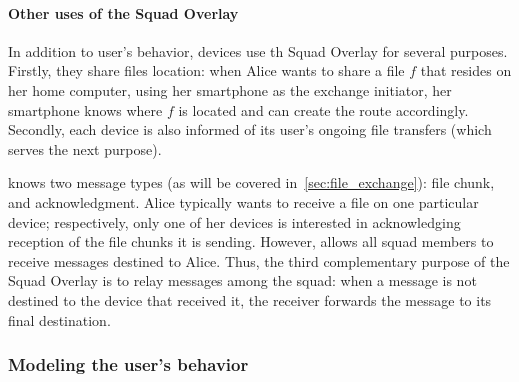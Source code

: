 


\paragraph*{Other uses of the Squad Overlay} In addition to user's behavior, devices use th Squad Overlay for several purposes. Firstly, they share files location: when Alice wants to share a file $f$ that resides on her home computer, using her smartphone as the exchange initiator, her smartphone knows where $f$ is located and can create the route accordingly. 
Secondly, each device is also informed of its user's ongoing file transfers (which serves the next purpose).

\name knows two message types (as will be covered in~\ref{sec:file_exchange}): file chunk, and acknowledgment.
Alice typically wants to receive a file on one particular device; respectively, only one of her devices is interested in acknowledging reception of the file chunks it is sending.
However, \name allows all squad members to receive messages destined to Alice.
Thus, the third complementary purpose of the Squad Overlay is to relay messages among the squad: when a message is not destined to the device that received it, the receiver forwards the message to its final destination.

\subsubsection{Modeling the user's behavior}
\label{sub:a_model_of_the_user_s_behavior}

